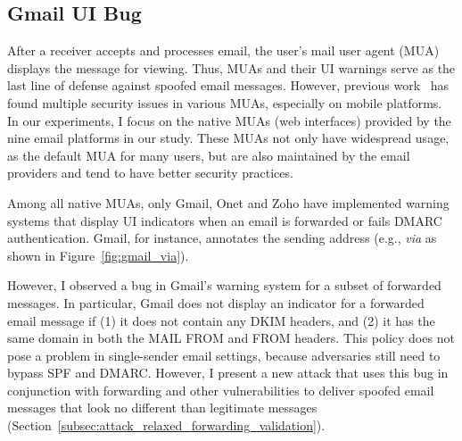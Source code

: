 \subsection{Gmail UI Bug}
\label{subsec:ui_bug}
After a receiver accepts and processes email,
the user's mail user agent (MUA) displays the message for viewing.
Thus, MUAs and their UI warnings serve as the last line of defense against spoofed email messages.
However, previous work~\cite{hu_end--end_nodate,shen2020weak,chen2020composition} has found multiple security issues in various MUAs, especially on mobile platforms.
In our experiments, I focus on the native MUAs (web interfaces) provided by the nine email platforms in our study.
These MUAs not only have widespread usage, as the default MUA for many users,
but are also maintained by the email providers and tend to have better security practices.

Among all native MUAs, only Gmail, Onet and Zoho have implemented warning
systems that display UI indicators when an email is forwarded or fails
DMARC authentication.  Gmail, for instance, annotates the
sending address (e.g.,  \textit{via}  as shown in Figure~\ref{fig:gmail_via}).


However, I observed a bug in Gmail's warning system for a subset of forwarded
messages. In particular, Gmail does not display an indicator for a forwarded
email message if (1) it does not contain any DKIM headers, and (2) it has the
same domain in both the \textsc{MAIL FROM} and \textsc{FROM} headers.
This policy does not pose a problem in single-sender email settings, because adversaries still need to bypass SPF and DMARC.
However, I present a new attack that uses this bug in conjunction with forwarding and other vulnerabilities to deliver spoofed email messages that look no
different than legitimate messages (Section~\ref{subsec:attack_relaxed_forwarding_validation}).

